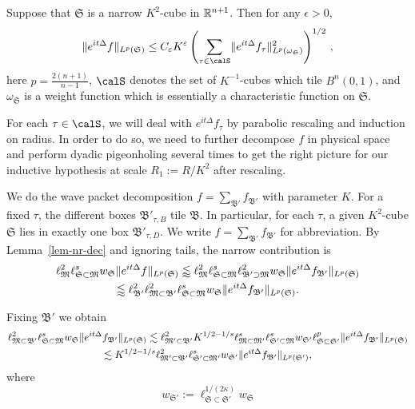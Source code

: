 \documentclass[biblatex]{pzorin-note}
\newcommand{\eit}{e^{i t \Delta}}
\newcommand{\bB}{\mathfrak{B}} %
\newcommand{\bM}{\mathfrak{M}} %
\newcommand{\bS}{\mathfrak{S}} %
\newcommand{\bBp}{\mathfrak{B}'} %
\newcommand{\bMp}{\mathfrak{M}'} %
\newcommand{\bSp}{\mathfrak{S}'} %
\begin{document}
\begin{lemma}\label{lem-nr-dec}
Suppose that $\bS$ is a narrow $K^2$-cube in $\mathbb{R}^{n+1}$.
Then for any $\epsilon>0$,
\[
\norm{\eit f}_{L^p(\bS)} \leq C_\epsilon K^{\epsilon} \left(\sum_{\tau\in \calS}\norm{\eit f_\tau}_{L^p(\omega_\bS)}^2\right)^{1/2} \,,
\]
here $p=\frac{2(n+1)}{n-1}$, $\calS$ denotes the set of $K^{-1}$-cubes which tile $B^n(0,1)$, and $\omega_\bS$ is a weight function which is essentially a characteristic function on $\bS$.
\end{lemma}

For each $\tau \in \calS$, we will deal with $\eit f_\tau$ by parabolic rescaling and induction on radius.
In order to do so, we need to further decompose $f$ in physical space and perform dyadic pigeonholing several times to get the right picture for our inductive hypothesis at scale $R_1:=R/K^2$ after rescaling.

We do the wave packet decomposition $f = \sum_{\bBp} f_{\bBp}$ with parameter $K$.
For a fixed $\tau$, the different boxes $\bBp_{\tau, B}$ tile $\bB$.
In particular, for each $\tau$, a given $K^2$-cube $\bS$ lies in exactly one box $\bBp_{\tau, D}$.
We write $f=\sum_{\bBp} f_{\bBp}$ for abbreviation.
By Lemma~\ref{lem-nr-dec} and ignoring tails, the narrow contribution is
\begin{multline} \label{eq-dec}
\ell^{2}_{\bM} \ell^{s}_{\bS \subset \bM} w_{\bS} \norm{ \eit f }_{L^{p}(\bS)}
\lessapprox
\ell^{2}_{\bM} \ell^{s}_{\bS \subset \bM} \ell^{2}_{\bBp \supset \bM} w_{\bS} \norm{ \eit f_{\bBp} }_{L^{p}(\bS)}\\
\lessapprox
\ell^{2}_{\bBp} \ell^{2}_{\bM \subset \bBp} \ell^{s}_{\bS \subset \bM} w_{\bS} \norm{ \eit f_{\bBp} }_{L^{p}(\bS)}.
\end{multline}

Fixing $\bBp$ we obtain
\begin{multline}
\label{eq:fixed-Box-norm}
\ell^{2}_{\bM \subset \bBp} \ell^{s}_{\bS \subset \bM} w_{\bS} \norm{ \eit f_{\bBp} }_{L^{p}(\bS)}
\lesssim
\ell^{2}_{\bMp \subset \bBp} K^{1/2-1/s} \ell^{s}_{\bM \subset \bMp} \ell^{s}_{\bSp \subset \bM} w_{\bSp} \ell^{p}_{\bS \subset \bSp} \norm{ \eit f_{\bBp} }_{L^{p}(\bS)}\\
\lesssim
K^{1/2 - 1/s} \ell^{2}_{\bMp \subset \bBp} \ell^{s}_{\bSp \subset \bMp} w_{\bSp} \norm{ \eit f_{\bBp} }_{L^{p}(\bSp)},
\end{multline}
where
\[
w_{\bSp} := \ell^{1/(2\kappa)}_{\bS \subset \bSp} w_{\bS}
\]
\end{document}
